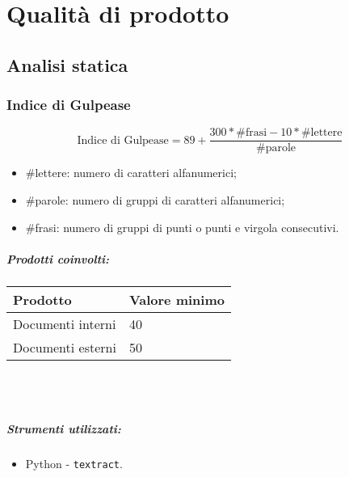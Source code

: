 \documentclass[a4paper, 12pt]{article}
\begin{document}
\makefrontpage

\makeversioni

\tableofcontents
\clearpage

\section{Qualità di prodotto}

\subsection{Analisi statica}
\subsubsection{Indice di Gulpease}
\[ \text{Indice di Gulpease} = 89 + \frac{300*\text{\#frasi} - 10*\text{\#lettere}}{\text{\#parole}} \]
\begin{itemize}
	\item \#lettere: numero di caratteri alfanumerici;
	\item \#parole: numero di gruppi di caratteri alfanumerici;
	\item \#frasi: numero di gruppi di punti o punti e virgola consecutivi.
\end{itemize}

\subparagraph{Prodotti coinvolti:}
\begin{center}
	\begin{tabularx}{\textwidth}{|X|X|}
		\hline
		\textbf{Prodotto} & \textbf{Valore minimo } \\
		\hline
		Documenti interni & 40                      \\
		\hline
		Documenti esterni & 50                      \\
		\hline
	\end{tabularx}\\[8pt]
	\mbox{}\\
\end{center}

\subparagraph{Strumenti utilizzati:}
\begin{itemize}
	\item Python - \texttt{textract}.
\end{itemize}
\end{document}
